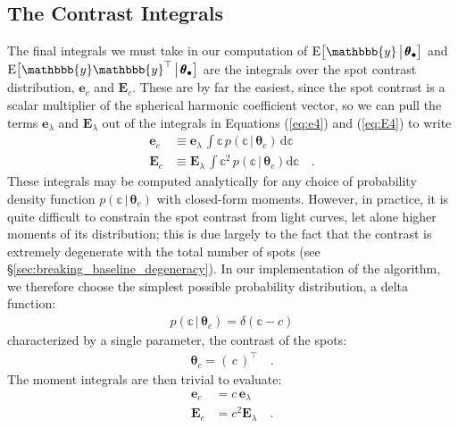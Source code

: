 \documentclass[modern]{aastex62}
\begin{document}
\subsection{The Contrast Integrals}
\label{sec:contrast}
%
The final integrals we must take in our computation of
$\mathrm{E} \big[ \mathbbb{y} \, \big| \, \pmb{\theta}_\bullet \big]$
and $\mathrm{E} \big[ \mathbbb{y} \mathbbb{y}^\top \, \big| \, \pmb{\theta}_\bullet \big]$
are the integrals over
the spot contrast distribution, $\mathbf{e}_c$ and $\mathbf{E}_c$.
These are by far the easiest, since the spot contrast is a scalar
multiplier of the spherical harmonic coefficient vector, so we can
pull the terms $\mathbf{e}_\lambda$ and $\mathbf{E}_\lambda$ out
of the
integrals in Equations (\ref{eq:e4}) and (\ref{eq:E4}) to write
%
\begin{align}
    \mathbf{e}_c
     & \equiv
    \mathbf{e}_\lambda \,
    \int
    \mathbb{c} \,
    p(\mathbb{c} \, \big| \, \pmb{\theta}_{c}) \,
    \mathrm{d}\mathbb{c}
    \\
    \mathbf{E}_c
     & \equiv
    \mathbf{E}_\lambda \,
    \int
    \mathbb{c}^2 \,
    p(\mathbb{c} \, \big| \, \pmb{\theta}_c)
    \mathrm{d}\mathbb{c}
    \quad.
\end{align}
%
These integrals may be computed analytically for any choice of
probability density function $p(\mathbb{c} \, \big| \, \pmb{\theta}_c)$
with closed-form moments.
%
However, in practice, it is quite difficult to constrain the
spot contrast from light curves, let alone higher moments of its
distribution; this is due largely to the fact that the contrast
is extremely degenerate with the total number of spots
(see \S\ref{sec:breaking_baseline_degeneracy}).
%
In our implementation of the algorithm,
we therefore choose the simplest possible probability distribution,
a delta function:
%
\begin{align}
    p(\mathbb{c} \, \big| \, \pmb{\theta}_{c}) = \delta(\mathbb{c} - c)
\end{align}
%
characterized by a single parameter, the contrast of the spots:
%
\begin{align}
    \pmb{\theta}_c = \left( \, c \, \right)^\top
    \quad.
\end{align}
%
The moment integrals are then trivial to evaluate:
%
\begin{align}
    \mathbf{e}_c & = c \, \mathbf{e}_\lambda
    \\
    \mathbf{E}_c & = c^2 \mathbf{E}_\lambda
    \quad.
\end{align}
%
\end{document}
